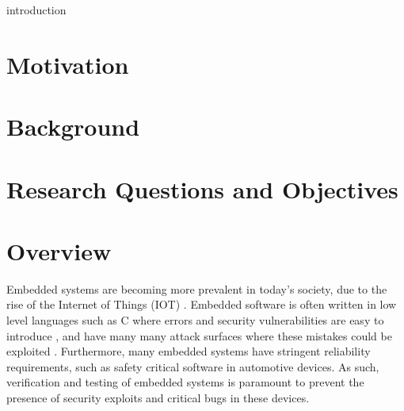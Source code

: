 \documentclass[../report.tex]{subfiles}
\begin{document}
introduction

\section{Motivation}

\section{Background}

\section{Research Questions and Objectives}


\section{Overview}


Embedded systems are becoming more prevalent in today's society, due to the
rise of the Internet of Things (IOT) \citep{Abdumohasan_2021}. Embedded
software is often written in low level languages such as C where errors and
security vulnerabilities are easy to introduce \citep{Svoboda_2021}, and have
many many attack surfaces where these mistakes could be exploited
\citep{Abdumohasan_2021}. Furthermore, many embedded systems have stringent
reliability requirements, such as safety critical software in automotive
devices. As such, verification and testing of embedded systems is paramount to
prevent the presence of security exploits and critical bugs in these devices.
\end{document}
